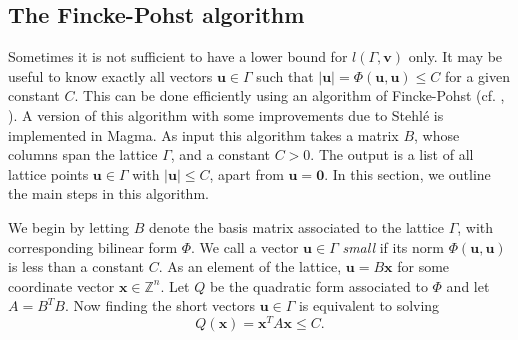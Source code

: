 \documentclass[11pt]{report}
\theoremstyle{definition}
\begin{document}

\subsection{The Fincke-Pohst algorithm}
\label{subsec:FinckePohst}

Sometimes it is not sufficient to have a lower bound for $l(\Gamma,\mathbf{v})$ only. It may be useful to know exactly all vectors $\mathbf{u} \in \Gamma$ such that $|\mathbf{u}|  = \Phi(\mathbf{u}, \mathbf{u}) \leq C$ for a given constant $C$. This can be done efficiently using an algorithm of Fincke-Pohst (cf. \cite{FP}, \cite{Coh1}). A version of this algorithm with some improvements due to Stehl\'e is implemented in Magma. As input this algorithm takes a matrix $B$, whose columns span the lattice $\Gamma$, and a constant $C > 0$. The output is a list of all lattice points $\mathbf{u} \in \Gamma$ with $|\mathbf{u}| \leq C$, apart from $\mathbf{u} = \mathbf{0}$. In this section, we outline the main steps in this algorithm.

We begin by letting $B$ denote the basis matrix associated to the lattice $\Gamma$, with corresponding bilinear form $\Phi$. We call a vector $\mathbf{u} \in \Gamma$ \textit{small} if its norm $\Phi(\mathbf{u}, \mathbf{u})$ is less than a constant $C$. As an element of the lattice, $\mathbf{u} = B\mathbf{x}$ for some coordinate vector $\mathbf{x} \in \mathbb{Z}^n$. Let $Q$ be the quadratic form associated to $\Phi$ and let $A=B^TB$. Now finding the short vectors $\mathbf{u} \in \Gamma$ is equivalent to solving
\begin{equation} \label{eq:ShortVector}
Q(\mathbf{x}) = \mathbf{x}^TA\mathbf{x} \leq C.
\end{equation}
\end{document}
